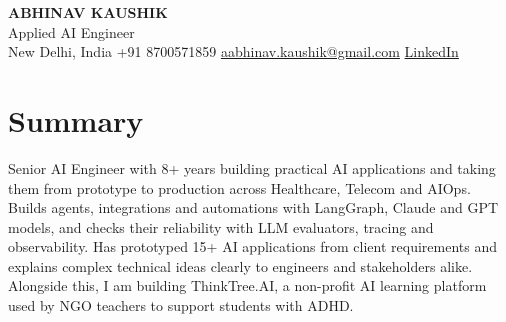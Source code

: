 \documentclass[10pt,a4paper]{article}
\begin{document}
\begin{center}
  {\LARGE\bfseries ABHINAV KAUSHIK}\\[2pt]
  {\large Applied AI Engineer}\\[2pt]
  New Delhi, India \textbar{} +91 8700571859 \textbar{} \href{mailto:aabhinav.kaushik@gmail.com}{aabhinav.kaushik@gmail.com} \textbar{} \href{https://www.linkedin.com/in/abhinav-kaushik10/}{LinkedIn}  
\end{center}

\section{Summary}
Senior AI Engineer with 8+ years building practical AI applications and taking them from prototype to production across Healthcare, Telecom and AIOps. Builds agents, integrations and automations with LangGraph, Claude and GPT models, and checks their reliability with LLM evaluators, tracing and observability. Has prototyped 15+ AI applications from client requirements and explains complex technical ideas clearly to engineers and stakeholders alike. Alongside this, I am building ThinkTree.AI, a non-profit AI learning platform used by NGO teachers to support students with ADHD.
\end{document}
